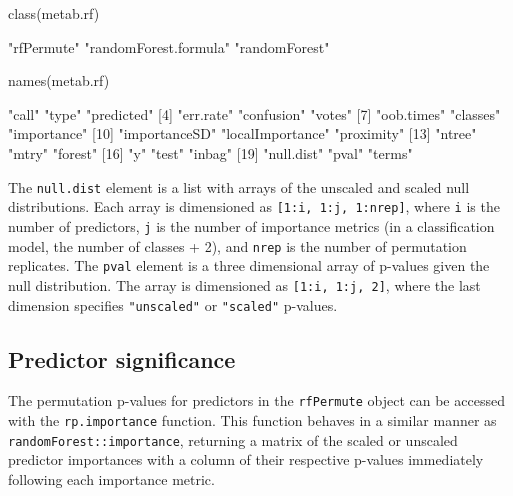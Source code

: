\begin{Schunk}
\begin{Sinput}
class(metab.rf)
\end{Sinput}
\begin{Soutput}
[1] "rfPermute"            "randomForest.formula" "randomForest"        
\end{Soutput}
\begin{Sinput}
names(metab.rf)
\end{Sinput}
\begin{Soutput}
 [1] "call"            "type"            "predicted"      
 [4] "err.rate"        "confusion"       "votes"          
 [7] "oob.times"       "classes"         "importance"     
[10] "importanceSD"    "localImportance" "proximity"      
[13] "ntree"           "mtry"            "forest"         
[16] "y"               "test"            "inbag"          
[19] "null.dist"       "pval"            "terms"          
\end{Soutput}
\end{Schunk}

The \texttt{null.dist} element is a list with arrays of the unscaled and
scaled null distributions. Each array is dimensioned as
\texttt{{[}1:i,\ 1:j,\ 1:nrep{]}}, where \texttt{i} is the number of
predictors, \texttt{j} is the number of importance metrics (in a
classification model, the number of classes + 2), and \texttt{nrep} is
the number of permutation replicates. The \texttt{pval} element is a
three dimensional array of p-values given the null distribution. The
array is dimensioned as \texttt{{[}1:i,\ 1:j,\ 2{]}}, where the last
dimension specifies \texttt{"unscaled"} or \texttt{"scaled"} p-values.

\subsection{Predictor significance}\label{predictor-significance}

The permutation p-values for predictors in the \texttt{rfPermute} object
can be accessed with the \texttt{rp.importance} function. This function
behaves in a similar manner as \texttt{randomForest::importance},
returning a matrix of the scaled or unscaled predictor importances with
a column of their respective p-values immediately following each
importance metric.

